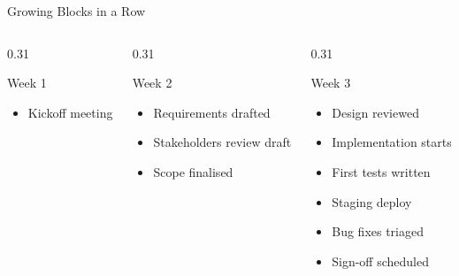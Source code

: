 \documentclass[aspectratio=169]{beamer}
\begin{document}
\begin{frame}{Growing Blocks in a Row}
  \begin{columns}[T]
    \begin{column}{0.31\textwidth}
      \begin{block}{Week 1}
        \begin{itemize}
          \item Kickoff meeting
        \end{itemize}
      \end{block}
    \end{column}
    \begin{column}{0.31\textwidth}
      \begin{block}{Week 2}
        \begin{itemize}
          \item Requirements drafted
          \item Stakeholders review draft
          \item Scope finalised
        \end{itemize}
      \end{block}
    \end{column}
    \begin{column}{0.31\textwidth}
      \begin{block}{Week 3}
        \begin{itemize}
          \item Design reviewed
          \item Implementation starts
          \item First tests written
          \item Staging deploy
          \item Bug fixes triaged
          \item Sign-off scheduled
        \end{itemize}
      \end{block}
    \end{column}
  \end{columns}
\end{frame}
\end{document}
